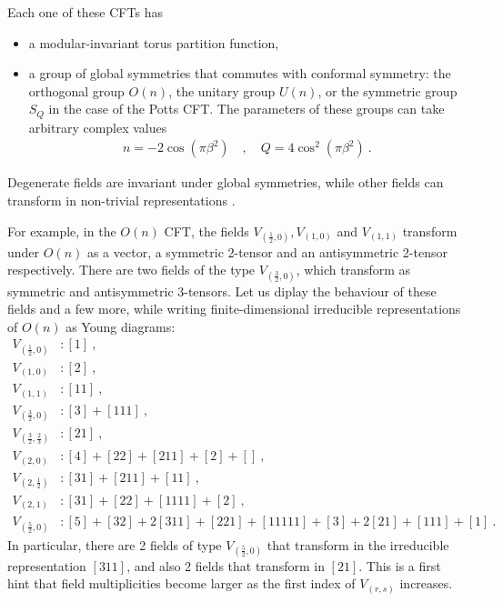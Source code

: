 \documentclass[12pt, a4paper]{article}
\theoremstyle{break}
\begin{document}
Each one of these CFTs has
\begin{itemize}
 \item a modular-invariant torus partition function,
 \item a group of global symmetries that commutes with conformal symmetry: the orthogonal group $O(n)$, the unitary group $U(n)$, or the symmetric group $S_Q$ in the case of the Potts CFT. The parameters of these groups can take arbitrary complex values \cite{gnjrs21, br19}
 \begin{align}
  \boxed{n = -2\cos\left(\pi \beta^2\right)} \quad , \quad \boxed{Q = 4\cos^2\left(\pi \beta^2\right)}\ .
  \label{nQ}
 \end{align}
\end{itemize}
Degenerate fields are invariant under global symmetries, while other fields can transform in non-trivial representations \cite{jrs22, rjrs24}. 

For example, in the $O(n)$ CFT, the fields $V_{(\frac12,0)},V_{(1,0)}$ and $V_{(1,1)}$ transform under $O(n)$ as a vector, a symmetric 2-tensor and an antisymmetric 2-tensor respectively. There are two fields of the type $V_{(\frac32,0)}$, which transform as symmetric and antisymmetric 3-tensors. Let us diplay the behaviour of these fields and a few more, while writing finite-dimensional irreducible representations of $O(n)$ as Young diagrams:
\begin{subequations}
\label{von}
\begin{align}
 V_{(\frac12,0)} &: [1]\ , \label{lhz}
 \\
 V_{(1,0)} &: [2]\ ,
 \\
 V_{(1,1)} &: [11]\ , \label{loo}
 \\
 V_{(\frac32,0)}&: [3]+[111]\ ,
\label{l320}
\\
V_{(\frac32,\frac23)} &: [21]\ ,
\label{l3223}
\\
V_{(2,0)}&: [4]+[22]+[211]+[2]+[]\ ,
\label{l20}
\\
V_{(2,\frac12)}& : [31]+[211]+[11]\ ,
\\
V_{(2,1)} &: [31]+[22]+[1111]+[2]\ ,
\label{l21}
\\
V_{(\frac52,0)} &: [5]+[32]+2[311]+[221]+[11111]+[3]+2[21]+[111]+[1]\ .
\label{l52}
\end{align}
\end{subequations}
In particular, there are 2 fields of type $V_{(\frac52,0)}$ that transform in the irreducible representation $[311]$, and also 2 fields that transform in $[21]$. This is a first hint that field multiplicities become larger as the first index of $V_{(r,s)}$ increases. 
\end{document}
